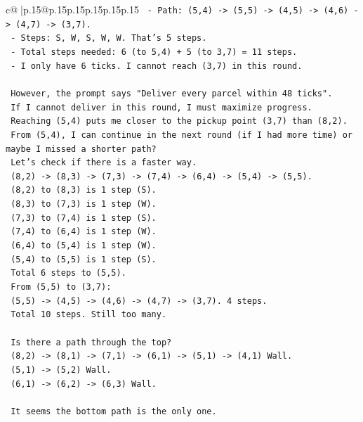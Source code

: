 \documentclass{article}
\begin{document}
{\begin{supertabular}{c@{$\;$}|p{.15\linewidth}@{}p{.15\linewidth}p{.15\linewidth}p{.15\linewidth}p{.15\linewidth}p{.15\linewidth}}
{{{\texttt{   {-} Path: (5,4) {-}> (5,5) {-}> (4,5) {-}> (4,6) {-}> (4,7) {-}> (3,7).} \\
\texttt{   {-} Steps: S, W, S, W, W. That's 5 steps.} \\
\texttt{   {-} Total steps needed: 6 (to 5,4) + 5 (to 3,7) = 11 steps.} \\
\texttt{   {-} I only have 6 ticks. I cannot reach (3,7) in this round.} \\
\\ 
\texttt{   However, the prompt says "Deliver every parcel within 48 ticks".} \\
\texttt{   If I cannot deliver in this round, I must maximize progress.} \\
\texttt{   Reaching (5,4) puts me closer to the pickup point (3,7) than (8,2).} \\
\texttt{   From (5,4), I can continue in the next round (if I had more time) or maybe I missed a shorter path?} \\
\texttt{   Let's check if there is a faster way.} \\
\texttt{   (8,2) {-}> (8,3) {-}> (7,3) {-}> (7,4) {-}> (6,4) {-}> (5,4) {-}> (5,5).} \\
\texttt{   (8,2) to (8,3) is 1 step (S).} \\
\texttt{   (8,3) to (7,3) is 1 step (W).} \\
\texttt{   (7,3) to (7,4) is 1 step (S).} \\
\texttt{   (7,4) to (6,4) is 1 step (W).} \\
\texttt{   (6,4) to (5,4) is 1 step (W).} \\
\texttt{   (5,4) to (5,5) is 1 step (S).} \\
\texttt{   Total 6 steps to (5,5).} \\
\texttt{   From (5,5) to (3,7):} \\
\texttt{   (5,5) {-}> (4,5) {-}> (4,6) {-}> (4,7) {-}> (3,7). 4 steps.} \\
\texttt{   Total 10 steps. Still too many.} \\
\\ 
\texttt{   Is there a path through the top?} \\
\texttt{   (8,2) {-}> (8,1) {-}> (7,1) {-}> (6,1) {-}> (5,1) {-}> (4,1) Wall.} \\
\texttt{   (5,1) {-}> (5,2) Wall.} \\
\texttt{   (6,1) {-}> (6,2) {-}> (6,3) Wall.} \\
\\ 
\texttt{   It seems the bottom path is the only one.} \\
}}}
\end{supertabular}}
\end{document}
